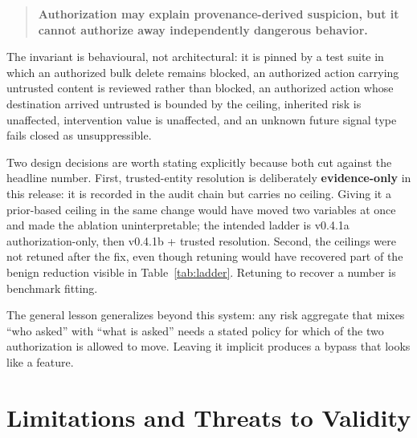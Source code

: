 \documentclass[letterpaper,twocolumn,10pt]{article}
\begin{document}
\begin{quote}
\textbf{Authorization may explain provenance-derived suspicion, but it cannot
authorize away independently dangerous behavior.}
\end{quote}

The invariant is behavioural, not architectural: it is pinned by a test suite in
which an authorized bulk delete remains blocked, an authorized action carrying
untrusted content is reviewed rather than blocked, an authorized action whose
destination arrived untrusted is bounded by the ceiling, inherited risk is
unaffected, intervention value is unaffected, and an unknown future signal type
fails closed as unsuppressible.

Two design decisions are worth stating explicitly because both cut against the
headline number. First, trusted-entity resolution is deliberately
\textbf{evidence-only} in this release: it is recorded in the audit chain but
carries no ceiling. Giving it a prior-based ceiling in the same change would
have moved two variables at once and made the ablation uninterpretable; the
intended ladder is v0.4.1a authorization-only, then v0.4.1b + trusted
resolution. Second, the ceilings were not retuned after the fix, even though
retuning would have recovered part of the benign reduction visible in
Table~\ref{tab:ladder}. Retuning to recover a number is benchmark fitting.

The general lesson generalizes beyond this system: any risk aggregate that
mixes ``who asked'' with ``what is asked'' needs a stated policy for which of
the two authorization is allowed to move. Leaving it implicit produces a bypass
that looks like a feature.

\section{Limitations and Threats to Validity}
\label{sec:limitations}
\end{document}
